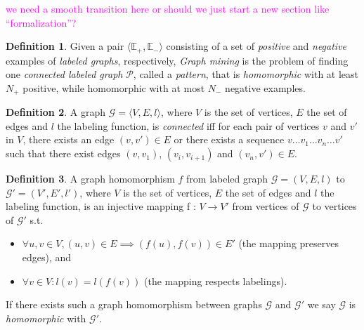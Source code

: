 \documentclass{article}
\theoremstyle{definition}
\newtheorem{definition}{Definition}[section]
\newcommand{\triple}[1]{\ensuremath{\langle #1 \rangle}}
\newcommand{\pair}[1]{\ensuremath{\left(#1\right)}}
\newcommand{\graph}[1]{\ensuremath{\mathcal{#1}}}
\newcommand{\graphset}[1]{\ensuremath{\mathbb{#1}}}
\newcommand{\sergey}[1]{\textcolor{magenta}{\marginpar{\sc Sergey} #1}}
\begin{document}
\sergey{we need a smooth transition here or should we just start a new section like ``formalization''?}

\begin{definition}
\label{def:GM1}
Given a pair $\triple{\graphset{E}_{+},\graphset{E}_{-}}$ consisting of a set of \emph{positive} and \emph{negative} examples of \emph{labeled graphs}, respectively,
\emph{Graph mining} is the problem of finding one \emph{connected labeled graph} $\graph{P}$, called a \emph{pattern},
that is \emph{homomorphic} with at least $N_{+}$ positive, while homomorphic with at most $N_{-}$ negative examples.
\end{definition}

\begin{definition}
A graph $\graph{G} = \triple{V,E,l}$, where $V$ is the set of vertices, $E$ the set of edges and $l$ the labeling function, is \emph{connected} iff for each pair of vertices $v$ and $v'$ in $V$, there exists an edge $\pair{v,v'} \in E$ or there exists a sequence $v \ldots v_{1} \ldots v_{n} \ldots v'$ such that there exist edges $\pair{v,v_{1}}$, $\pair{v_{i},v_{i+1}}$ and $\pair{v_{n},v'} \in E$.
\end{definition}


\begin{definition}
A graph homomorphism $f$ from labeled graph $\graph{G} = (V,E,l)$ to $\graph{G}' = (V',E',l')$, where $V$ is the set of vertices, $E$ the set of edges and $l$ the labeling function, is an injective mapping f : $V \rightarrow V'$ from vertices of $\graph{G}$ to vertices of $\graph{G'}$ s.t. 
\begin{itemize}
\item $\forall u,v \in V, \pair{u,v} \in E \implies \pair{f(u),f(v)} \in E'$ (the mapping preserves edges), and 
\item $\forall v \in V : l(v) = l(f(v))$ (the mapping respects labelings).
\end{itemize}
If there exists such a graph homomorphism between graphs $\graph{G}$ and $\graph{G'}$ we say $\graph{G}$ is \emph{homomorphic} with $\graph{G'}$.
\end{definition}
\end{document}
